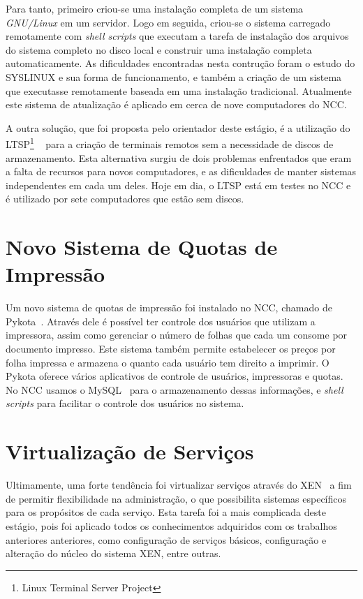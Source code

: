 \documentclass[a4paper,11pt]{article}
\begin{document}
Para tanto, primeiro criou-se uma instalação completa de um sistema
\textit{GNU/Linux} em um servidor. Logo em seguida, criou-se o sistema
carregado remotamente com \textit{shell scripts} que executam a tarefa
de instalação dos arquivos do sistema completo no disco local e
construir uma instalação completa automaticamente. As dificuldades
encontradas nesta contrução foram o estudo do SYSLINUX e sua forma
de funcionamento,
e também a criação de um sistema que executasse remotamente baseada em
uma instalação tradicional. Atualmente este sistema de atualização é
aplicado em cerca de nove computadores do NCC.

A outra solução, que foi proposta pelo orientador deste estágio, é a
utilização do LTSP\footnote{Linux Terminal Server Project}
~\cite{ltsp,ltspgentoo}
para a
criação de terminais remotos sem a necessidade de discos de
armazenamento. Esta alternativa surgiu de dois problemas enfrentados
que eram a falta de recursos para novos computadores, e as
dificuldades de manter sistemas independentes em cada um deles. Hoje
em dia, o LTSP está em testes no NCC e é utilizado por sete
computadores que estão sem discos.

\section{Novo Sistema de Quotas de Impressão}

Um  novo sistema de quotas de impressão foi instalado no NCC, chamado
de Pykota~\cite{pykota}. Através dele é possível ter controle
dos usuários que utilizam a impressora, assim como gerenciar o número
de folhas que cada um consome por documento impresso. Este sistema
também permite estabelecer os preços por folha impressa e armazena o
quanto cada usuário tem direito a imprimir. O Pykota oferece vários
aplicativos de controle de usuários, impressoras e quotas. No NCC
usamos o MySQL~\cite{mysql,mysqlgentoo} para o armazenamento dessas
informações, e \textit{shell scripts} para facilitar o controle dos
usuários no sistema.

\section{Virtualização de Serviços}

Ultimamente, uma forte tendência foi virtualizar serviços através do
XEN~\cite{xen,xengentoo} a fim de
permitir flexibilidade na administração, o que possibilita sistemas
específicos para os propósitos de cada serviço.  Esta tarefa foi a mais
complicada deste estágio, pois foi aplicado todos os conhecimentos
adquiridos com os trabalhos anteriores anteriores,
como configuração de serviços básicos,
configuração e alteração do núcleo do sistema XEN, entre outras.
\end{document}
